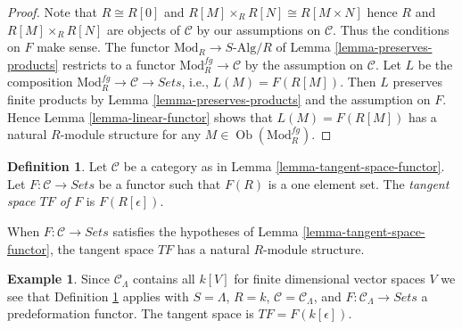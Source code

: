 \documentclass{stacks-project}
\theoremstyle{plain}
\theoremstyle{definition}
\newtheorem{definition}[subsection]{Definition}
\newtheorem{example}[subsection]{Example}
\theoremstyle{remark}
\numberwithin{equation}{subsection}
\def\Ob{\mathop{\mathrm{Ob}}\nolimits}
\begin{document}
\begin{proof}
Note that $R \cong R[0]$ and $R[M] \times_R R[N] \cong R[M \times N]$ hence
$R$ and $R[M] \times_R R[N]$ are objects of $\mathcal{C}$ by our assumptions on
$\mathcal{C}$. Thus the conditions on $F$ make sense.
The functor $\text{Mod}_R \to S\text{-Alg}/R$ of
Lemma \ref{lemma-preserves-products}
restricts to a functor $\text{Mod}^{fg}_R \to \mathcal{C}$
by the assumption on $\mathcal{C}$. Let $L$ be the composition
$\text{Mod}^{fg}_R \to \mathcal{C} \to \textit{Sets}$, i.e.,
$L(M) = F(R[M])$.
Then $L$ preserves finite products by
Lemma \ref{lemma-preserves-products}
and the assumption on $F$. Hence
Lemma \ref{lemma-linear-functor}
shows that $L(M) = F(R[M])$ has a natural $R$-module structure for any
$M \in \Ob(\text{Mod}^{fg}_R)$.
\end{proof}

\begin{definition}
\label{definition-tangent-space-over-R}
Let $\mathcal{C}$ be a category as in
Lemma \ref{lemma-tangent-space-functor}.
Let $F : \mathcal{C} \to \textit{Sets}$ be a functor such that
$F(R)$ is a one element set. The {\it tangent space $TF$ of $F$} is
$F(R[\epsilon])$.
\end{definition}

\noindent
When $F : \mathcal{C} \to \textit{Sets}$ satisfies the hypotheses of
Lemma \ref{lemma-tangent-space-functor},
the tangent space $TF$ has a natural $R$-module structure.

\begin{example}
\label{example-tangent-space-functor}
Since $\mathcal{C}_\Lambda$ contains all $k[V]$ for finite dimensional
vector spaces $V$ we see that
Definition \ref{definition-tangent-space-over-R} applies with
$S = \Lambda$, $R = k$, $\mathcal{C} = \mathcal{C}_\Lambda$, and
$F : \mathcal{C}_\Lambda \to \textit{Sets}$ a
predeformation functor. The tangent space is $TF = F(k[\epsilon])$.
\end{example}
\end{document}
